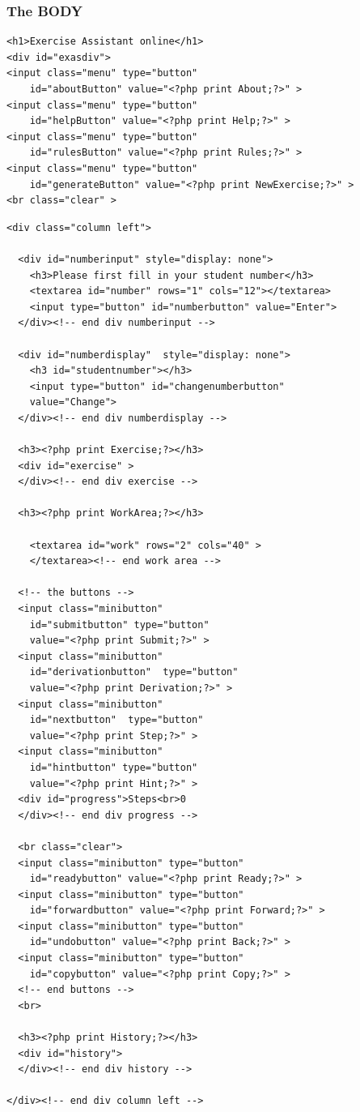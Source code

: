 \documentclass{article}
\begin{document}
\subsubsection{The BODY}
\begin{verbatim}
<h1>Exercise Assistant online</h1>
<div id="exasdiv">
<input class="menu" type="button" 
    id="aboutButton" value="<?php print About;?>" >
<input class="menu" type="button" 
    id="helpButton" value="<?php print Help;?>" >
<input class="menu" type="button" 
    id="rulesButton" value="<?php print Rules;?>" >
<input class="menu" type="button" 
    id="generateButton" value="<?php print NewExercise;?>" >
<br class="clear" >
\end{verbatim}
\begin{verbatim}
<div class="column left">

  <div id="numberinput" style="display: none">
    <h3>Please first fill in your student number</h3>
    <textarea id="number" rows="1" cols="12"></textarea>
    <input type="button" id="numberbutton" value="Enter">
  </div><!-- end div numberinput -->
	
  <div id="numberdisplay"  style="display: none">
    <h3 id="studentnumber"></h3>
    <input type="button" id="changenumberbutton" 
    value="Change">
  </div><!-- end div numberdisplay -->
	
  <h3><?php print Exercise;?></h3>
  <div id="exercise" >
  </div><!-- end div exercise -->

  <h3><?php print WorkArea;?></h3>

	<textarea id="work" rows="2" cols="40" >	
	</textarea><!-- end work area -->
	
  <!-- the buttons -->
  <input class="minibutton" 
    id="submitbutton" type="button" 
    value="<?php print Submit;?>" >	
  <input class="minibutton" 
    id="derivationbutton"  type="button" 
    value="<?php print Derivation;?>" >
  <input class="minibutton" 
    id="nextbutton"  type="button" 
    value="<?php print Step;?>" >
  <input class="minibutton" 
    id="hintbutton" type="button" 
    value="<?php print Hint;?>" >
  <div id="progress">Steps<br>0
  </div><!-- end div progress -->
	
  <br class="clear">
  <input class="minibutton" type="button" 
    id="readybutton" value="<?php print Ready;?>" >
  <input class="minibutton" type="button" 
    id="forwardbutton" value="<?php print Forward;?>" >
  <input class="minibutton" type="button" 
    id="undobutton" value="<?php print Back;?>" >
  <input class="minibutton" type="button" 
    id="copybutton" value="<?php print Copy;?>" >
  <!-- end buttons -->
  <br>
	
  <h3><?php print History;?></h3>
  <div id="history">
  </div><!-- end div history -->

</div><!-- end div column left -->
\end{verbatim}
\end{document}
